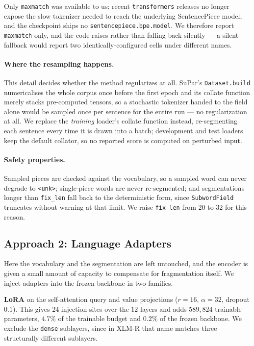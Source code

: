 \documentclass[11pt]{article}
\begin{document}
Only \texttt{maxmatch} was available to us: recent \texttt{transformers} releases
no longer expose the slow tokenizer needed to reach the underlying SentencePiece
model, and the checkpoint ships no \texttt{sentencepiece.bpe.model}. We therefore
report \texttt{maxmatch} only, and the code raises rather than falling back
silently --- a silent fallback would report two identically-configured cells
under different names.

\paragraph{Where the resampling happens.} This detail decides whether the method
regularizes at all.
SuPar's \texttt{Dataset.build} numericalises the whole corpus once before the
first epoch and its collate function merely stacks pre-computed tensors, so a
stochastic tokenizer handed to the field alone would be sampled once per sentence
for the entire run --- no regularization at all. We replace the \emph{training}
loader's collate function instead, re-segmenting each sentence every time it is
drawn into a batch; development and test loaders keep the default collator, so no
reported score is computed on perturbed input.

\paragraph{Safety properties.} Sampled pieces are checked against the vocabulary,
so a sampled word can never degrade to \texttt{<unk>}; single-piece words are
never re-segmented; and segmentations longer than \texttt{fix\_len} fall back to
the deterministic form, since \texttt{SubwordField} truncates without warning at
that limit. We raise \texttt{fix\_len} from $20$ to $32$ for this reason.

\subsection{Approach 2: Language Adapters}
\label{sec:adapters}

Here the vocabulary and the segmentation are left untouched, and the encoder is
given a small amount of capacity to compensate for fragmentation itself. We inject
adapters into the frozen backbone in two families.

\textbf{LoRA} \citep{hu-etal-2022-lora} on the self-attention query and value
projections ($r{=}16$, $\alpha{=}32$, dropout $0.1$). This gives $24$ injection
sites over the $12$ layers and adds $589{,}824$ trainable parameters, $4.7\%$ of
the trainable budget and $0.2\%$ of the frozen backbone. We exclude the \texttt{dense} sublayers, since in XLM-R that name matches
three structurally different sublayers.
\end{document}
